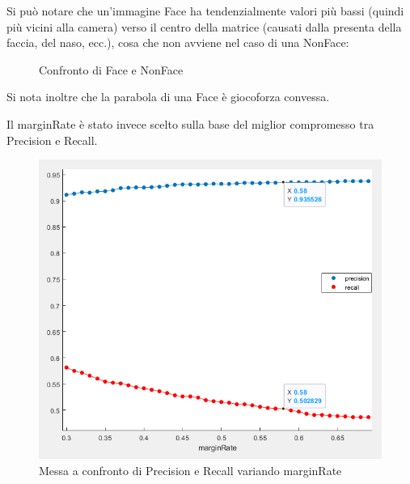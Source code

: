 \documentclass[
  italian,
]{article}
\begin{document}
\pagebreak

Si può notare che un'immagine Face ha tendenzialmente valori più bassi
(quindi più vicini alla camera) verso il centro della matrice (causati
dalla presenta della faccia, del naso, ecc.), cosa che non avviene nel caso di una NonFace:

\begin{figure}
\centering
{}%
\qquad
{}%
\caption{Confronto di Face e NonFace}
\end{figure}


Si nota inoltre che la parabola di una Face è giocoforza convessa.

Il marginRate è stato invece scelto sulla base del miglior compromesso
tra Precision e Recall.

\begin{figure}
\centering
\includegraphics[width=\textwidth,height=0.31\textheight]{img/testingGraph.png}
\caption{Messa a confronto di Precision e Recall variando marginRate}
\end{figure}
\end{document}
